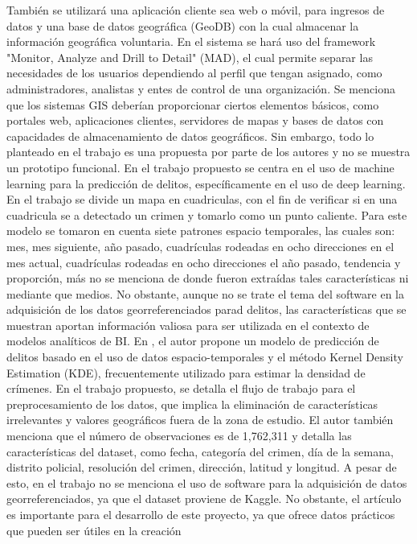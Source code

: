 También se utilizará una aplicación cliente sea web o móvil, para ingresos de datos y una base de datos geográfica (GeoDB) con
la cual almacenar la información geográfica voluntaria. En el sistema se hará uso del framework "Monitor, Analyze and Drill to Detail"
(MAD), el cual permite separar las necesidades de los usuarios dependiendo al perfil que tengan asignado, como administradores,
analistas y entes de control de una organización. Se menciona que los sistemas GIS deberían proporcionar ciertos elementos básicos,
como portales web, aplicaciones clientes, servidores de mapas y bases de datos con capacidades de almacenamiento de datos geográficos.
Sin embargo, todo lo planteado en el trabajo es una propuesta por parte de los autores y no se muestra un prototipo funcional.
\bigbreak
En \cite{linUsingMachineLearning2017} el trabajo propuesto se centra en el uso de machine learning para la predicción de delitos,
específicamente en el uso de deep learning. En el trabajo se divide un mapa en cuadriculas, con el fin de verificar si en una cuadricula
se a detectado un crimen y tomarlo como un punto caliente. Para este modelo se tomaron en cuenta siete patrones espacio temporales,
las cuales son: mes, mes siguiente, año pasado, cuadrículas rodeadas en ocho direcciones en el mes actual, cuadrículas rodeadas en
ocho direcciones el año pasado, tendencia y proporción, más no se menciona de donde fueron extraídas tales características ni mediante
que medios. No obstante, aunque no se trate el tema del software en la adquisición de los datos georreferenciados parad delitos, las
características que se muestran aportan información valiosa para ser utilizada en el contexto de modelos analíticos de BI.
\bigbreak
En \cite{CrimesPredictionUsing2019}, el autor propone un modelo de predicción de delitos basado en el uso de datos espacio-temporales
y el método Kernel Density Estimation (KDE), frecuentemente utilizado para estimar la densidad de crímenes. En el trabajo propuesto,
se detalla el flujo de trabajo para el preprocesamiento de los datos, que implica la eliminación de características irrelevantes y valores
geográficos fuera de la zona de estudio. El autor también menciona que el número de observaciones es de 1,762,311 y detalla las características
del dataset, como fecha, categoría del crimen, día de la semana, distrito policial, resolución del crimen, dirección, latitud y longitud.
A pesar de esto, en el trabajo no se menciona el uso de software para la adquisición de datos georreferenciados, ya que el dataset proviene de Kaggle.
No obstante, el artículo es importante para el desarrollo de este proyecto, ya que ofrece datos prácticos que pueden ser útiles en la creación
